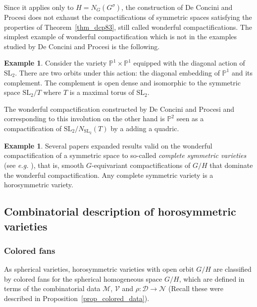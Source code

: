 \documentclass{amsart}
\theoremstyle{definition}
\newtheorem{exa}[thm]{Example}
\begin{document}
Since it applies only to $H=N_G(G^{\sigma})$, the construction of 
De Concini and Procesi does not exhaust the compactifications of 
symmetric spaces satisfying the properties of Theorem~\ref{thm_dcp83}, 
still called wonderful compactifications. 
The simplest example of wonderful compactification which is not 
in the examples studied by De Concini and Procesi is the following.
\begin{exa}
\label{exa_wond_P1xP1}
Consider the variety $\mathbb{P}^1\times \mathbb{P}^1$ equipped 
with the diagonal action of $\mathrm{SL}_2$. There are two orbits under 
this action: the diagonal embedding of $\mathbb{P}^1$ and its 
complement. The complement is open dense and isomorphic to the 
symmetric space $\mathrm{SL}_2/T$ where $T$ is a maximal torus of 
$\mathrm{SL}_2$. 

The wonderful compactification constructed by De Concini and Procesi 
and corresponding to this involution on the other hand is $\mathbb{P}^2$ 
seen as a compactification of $\mathrm{SL}_2/N_{\mathrm{SL}_2}(T)$ by 
a adding a quadric.
\end{exa}

\begin{exa}
Several papers expanded results valid on the wonderful compactification 
of a symmetric space to so-called \emph{complete symmetric varieties}
(see \emph{e.g.} \cite{DCP85,Bif90}), 
that is, smooth $G$-equivariant compactifications of $G/H$ that 
dominate the wonderful compactification. 
Any complete symmetric variety is a horosymmetric variety.
\end{exa}

\subsection{Combinatorial description of horosymmetric varieties}

\subsubsection{Colored fans}

As spherical varieties, horosymmetric varieties with open orbit $G/H$ 
are classified by colored fans for the spherical homogeneous space $G/H$, 
which are defined in terms of the combinatorial data $\mathcal{M}$, 
$\mathcal{V}$ and $\rho:\mathcal{D}\rightarrow \mathcal{N}$ 
(Recall these were described in Proposition~\ref{prop_colored_data}). 
\end{document}
